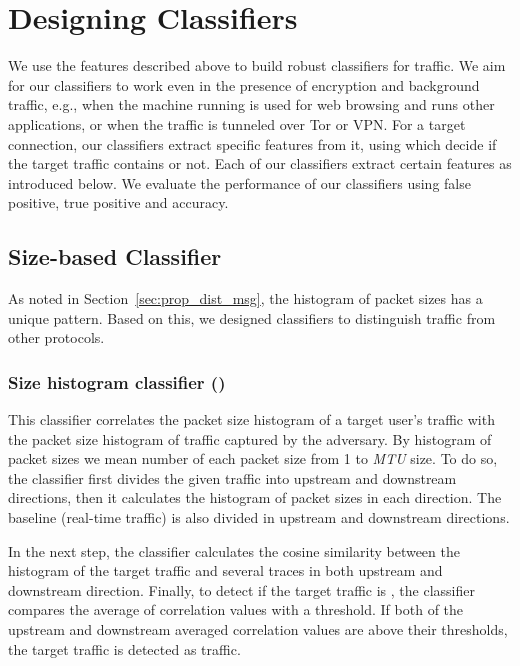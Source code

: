 \section{Designing \bc Classifiers}
We use the features described above to build robust classifiers for \bc traffic. 
We aim for our classifiers to work even in the presence of encryption and background traffic, e.g., 
when the machine running \bc is used for web browsing and runs other applications, or when the \bc traffic is tunneled over Tor or VPN. %
For a target connection, our classifiers extract specific features from it, using which decide if the target traffic contains \bc or not. Each of our classifiers extract certain features as introduced below. We evaluate the performance of our classifiers using false positive, true positive and accuracy.

\subsection{Size-based Classifier}
As noted in Section~\ref{sec:prop_dist_msg}, the histogram of \bc packet sizes has a unique pattern. Based on this, we designed  classifiers to distinguish \bc traffic from other protocols. 

\subsubsection{Size histogram classifier ()}\label{sec:all-packet-size-classifier}

This classifier correlates the packet size histogram of a target user's traffic with the packet size histogram of \bc traffic captured by the adversary. By histogram of packet sizes we mean number of each packet size from 1 to \textit{MTU} size. To do so, the classifier first divides the given traffic into upstream and downstream directions, then it calculates the histogram of packet sizes in each direction.  The baseline (real-time \bc traffic) is also divided in upstream and downstream directions. 

In the next step, the classifier calculates the cosine similarity between the histogram of the target traffic and several \bc traces in both upstream and downstream direction. Finally, to detect if the target traffic is \bc, the classifier compares the average of correlation values with a threshold. If both of the upstream and downstream averaged correlation values are above their thresholds, the target traffic is detected as \bc traffic. %


